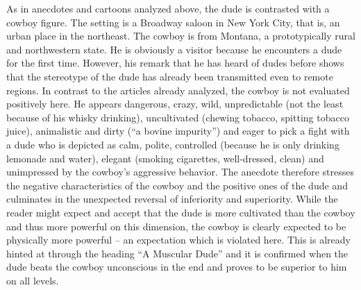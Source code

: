 As in anecdotes and cartoons analyzed above, the dude is contrasted with a cowboy figure. The setting is a Broadway saloon in New York City, that is, an urban place in the northeast. The cowboy is from Montana, a prototypically rural and northwestern state. He is obviously a visitor because he encounters a dude for the first time. However, his remark that he has heard of dudes before shows that the stereotype of the dude has already been transmitted even to remote regions. In contrast to the articles already analyzed, the cowboy is not evaluated positively here. He appears dangerous, crazy, wild, unpredictable (not the least because of his whisky drinking), uncultivated (chewing tobacco, spitting tobacco juice), animalistic and dirty (“a bovine impurity”) and eager to pick a fight with a dude who is depicted as calm, polite, controlled (because he is only drinking lemonade and water), elegant (smoking cigarettes, well-dressed, clean) and unimpressed by the cowboy’s aggressive behavior. The anecdote therefore stresses the negative characteristics of the cowboy and the positive ones of the dude and culminates in the unexpected reversal of inferiority and superiority. While the reader might expect and accept that the dude is more cultivated than the cowboy and thus more powerful on this dimension, the cowboy is clearly expected to be physically more powerful – an expectation which is violated here. This is already hinted at through the heading “A Muscular Dude” and it is confirmed when the dude beats the cowboy unconscious in the end and proves to be superior to him on all levels.

